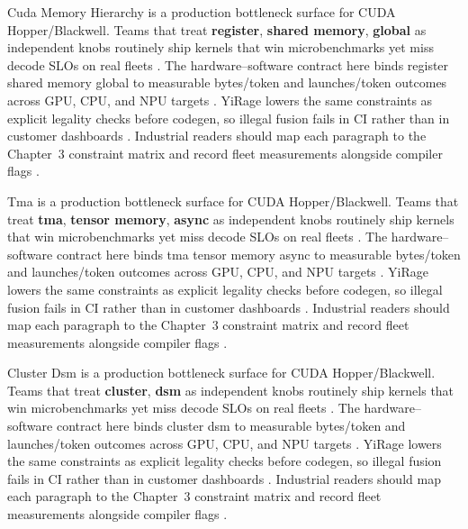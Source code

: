 Cuda Memory Hierarchy is a production bottleneck surface for CUDA Hopper/Blackwell. Teams that treat \textbf{register}, \textbf{shared memory}, \textbf{global} as independent knobs routinely ship kernels that win microbenchmarks yet miss decode SLOs on real fleets \citep{amd2024aie,kwon2023vllm}. The hardware--software contract here binds register shared memory global to measurable bytes/token and launches/token outcomes across GPU, CPU, and NPU targets \citep{dlbook,nvidia2024cudagraphs}. YiRage lowers the same constraints as explicit legality checks before codegen, so illegal fusion fails in CI rather than in customer dashboards \citep{dao2022flashattention,liu2024deepseekv3}. Industrial readers should map each paragraph to the Chapter~3 constraint matrix and record fleet measurements alongside compiler flags \citep{kwon2023vllm,patel2025llminference}.

Tma is a production bottleneck surface for CUDA Hopper/Blackwell. Teams that treat \textbf{tma}, \textbf{tensor memory}, \textbf{async} as independent knobs routinely ship kernels that win microbenchmarks yet miss decode SLOs on real fleets \citep{dlbook,nvidia2024cudagraphs}. The hardware--software contract here binds tma tensor memory async to measurable bytes/token and launches/token outcomes across GPU, CPU, and NPU targets \citep{dao2022flashattention,liu2024deepseekv3}. YiRage lowers the same constraints as explicit legality checks before codegen, so illegal fusion fails in CI rather than in customer dashboards \citep{kwon2023vllm,patel2025llminference}. Industrial readers should map each paragraph to the Chapter~3 constraint matrix and record fleet measurements alongside compiler flags \citep{nvidia2024cudagraphs,taxbreak2026}.

Cluster Dsm is a production bottleneck surface for CUDA Hopper/Blackwell. Teams that treat \textbf{cluster}, \textbf{dsm} as independent knobs routinely ship kernels that win microbenchmarks yet miss decode SLOs on real fleets \citep{dao2022flashattention,liu2024deepseekv3}. The hardware--software contract here binds cluster dsm to measurable bytes/token and launches/token outcomes across GPU, CPU, and NPU targets \citep{kwon2023vllm,patel2025llminference}. YiRage lowers the same constraints as explicit legality checks before codegen, so illegal fusion fails in CI rather than in customer dashboards \citep{nvidia2024cudagraphs,taxbreak2026}. Industrial readers should map each paragraph to the Chapter~3 constraint matrix and record fleet measurements alongside compiler flags \citep{liu2024deepseekv3,memoryfloor2026}.

